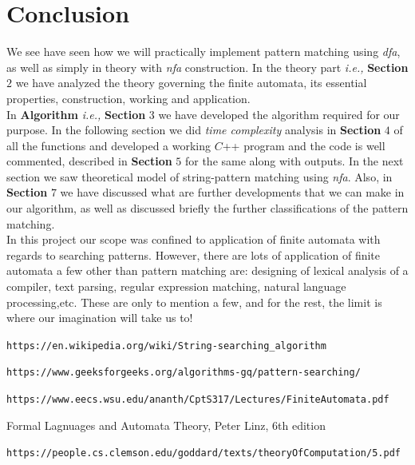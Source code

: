 \documentclass[12pt,a4paper]{article}%
\begin{document}
	\section{Conclusion}
	\begin{flushleft}
		\fontsize{12pt}{20pt}\selectfont
		We see have seen how we will practically implement pattern matching using \textit{dfa}, as well as simply in theory with \textit{nfa} construction. In the theory part \textit{i.e.,} \textbf{Section} $2$ we have analyzed the theory governing the finite automata, its essential properties, construction, working and application.\\\bigskip
		In \textbf{Algorithm} \textit{i.e.,} \textbf{Section} $3$ we have developed the algorithm required for our purpose. In the following section we did \textit{time complexity} analysis in \textbf{Section} $4$ of all the functions and developed a working $C$++ program and the code is well commented, described in \textbf{Section} $5$ for the same along with outputs. In the next section we saw theoretical model of string-pattern matching using \textit{nfa}. Also, in \textbf{Section} $7$ we have  discussed what are further developments that we  can make in our algorithm, as well as discussed briefly the further classifications of the pattern matching.\\\bigskip
		In this project our scope was confined to application of finite automata with regards to searching patterns. However, there are lots of application of finite automata a few other than pattern matching are: designing of lexical analysis of a compiler, text parsing, regular expression matching, natural language processing,etc. These are only to mention a few, and for the rest, the limit is where our imagination will take us to!
	\end{flushleft}
	\pagebreak
	
	\begin{thebibliography}{9}
		\texttt{https://en.wikipedia.org/wiki/String-searching\_algorithm}
		
		\texttt{https://www.geeksforgeeks.org/algorithms-gq/pattern-searching/}
		
		\texttt{https://www.eecs.wsu.edu/\texttildelow ananth/CptS317/Lectures/FiniteAutomata.pdf}
		
		Formal Lagnuages and Automata Theory, Peter Linz, 6th edition
		
		\texttt{https://people.cs.clemson.edu/\texttildelow goddard/texts/theoryOfComputation/5.pdf}
	\end{thebibliography}
	
\end{document}

